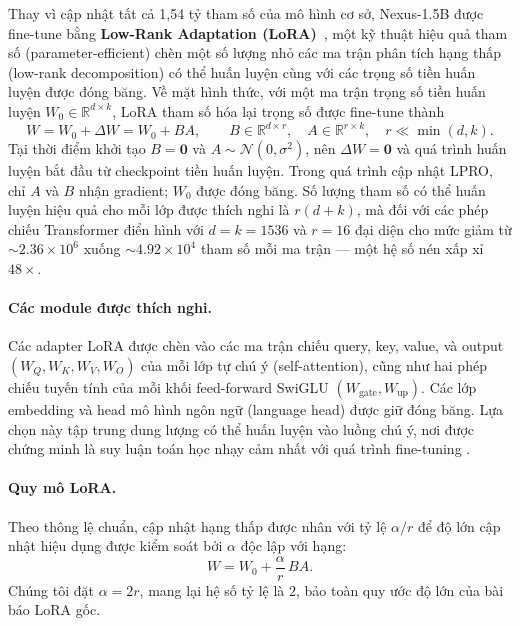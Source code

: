 \documentclass[11pt,a4paper]{article}
\begin{document}
Thay vì cập nhật tất cả 1,54 tỷ tham số của mô hình cơ sở, Nexus-1.5B được
fine-tune bằng \textbf{Low-Rank Adaptation (LoRA)}~\citep{hu2022lora}, một
kỹ thuật hiệu quả tham số (parameter-efficient) chèn một số lượng nhỏ các ma trận
phân tích hạng thấp (low-rank decomposition) có thể huấn luyện cùng với các trọng số tiền huấn luyện được đóng băng. Về mặt hình thức, với một ma trận trọng số tiền huấn luyện
\(W_0 \in \mathbb{R}^{d \times k}\), LoRA tham số hóa lại trọng số được fine-tune thành
\begin{equation}
  W = W_0 + \Delta W = W_0 + BA,
  \qquad B \in \mathbb{R}^{d\times r},\quad A \in \mathbb{R}^{r\times k},\quad r \ll \min(d,k).
\label{eq:lora}
\end{equation}
Tại thời điểm khởi tạo \(B=\mathbf{0}\) và \(A\sim\mathcal{N}(0,\sigma^2)\), nên
\(\Delta W=\mathbf{0}\) và quá trình huấn luyện bắt đầu từ checkpoint tiền huấn luyện.
Trong quá trình cập nhật LPRO, chỉ \(A\) và \(B\) nhận gradient; \(W_0\) được đóng băng.
Số lượng tham số có thể huấn luyện hiệu quả cho mỗi lớp được thích nghi là
\(r(d+k)\), mà đối với các phép chiếu Transformer điển hình với \(d=k=1536\) và
\(r=16\) đại diện cho mức giảm từ \(\sim 2.36 \times 10^6\) xuống
\(\sim 4.92\times 10^4\) tham số mỗi ma trận — một hệ số nén xấp xỉ
\(48\times\).

\paragraph{Các module được thích nghi.} Các adapter LoRA được chèn vào các ma trận chiếu
query, key, value, và output \((W_Q, W_K, W_V, W_O)\) của mỗi lớp tự chú ý (self-attention),
cũng như hai phép chiếu tuyến tính của mỗi khối feed-forward SwiGLU \((W_{\text{gate}},
W_{\text{up}})\). Các lớp embedding và head mô hình ngôn ngữ (language head) được giữ đóng băng.
Lựa chọn này tập trung dung lượng có thể huấn luyện vào luồng chú ý, nơi
được chứng minh là suy luận toán học nhạy cảm nhất với quá trình fine-tuning
\citep{hu2022lora}.

\paragraph{Quy mô LoRA.} Theo thông lệ chuẩn, cập nhật hạng thấp được nhân với tỷ lệ
\(\alpha/r\) để độ lớn cập nhật hiệu dụng được kiểm soát bởi \(\alpha\)
độc lập với hạng:
\begin{equation}
  W = W_0 + \frac{\alpha}{r}\,BA.
\label{eq:lora_scaled}
\end{equation}
Chúng tôi đặt \(\alpha = 2r\), mang lại hệ số tỷ lệ là \(2\), bảo toàn
quy ước độ lớn của bài báo LoRA gốc.
\end{document}
